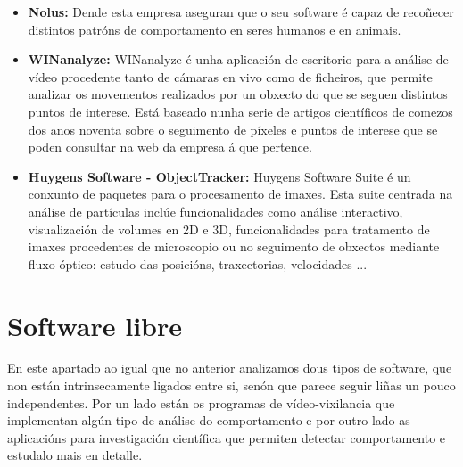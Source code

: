         \begin{itemize}
        \item  \textbf{Nolus:}\cite{nolus-human-behaviour}
            Dende esta empresa aseguran que o seu software é capaz de recoñecer distintos patróns de 
            comportamento en seres humanos e en animais.
        
        \item \textbf{WINanalyze:}\cite{WINanalyze-web-page}
            WINanalyze é unha aplicación de escritorio para a análise de vídeo procedente tanto de 
            cámaras en vivo como de ficheiros, que permite analizar os movementos realizados por un 
            obxecto do que se seguen distintos puntos de interese. Está baseado nunha serie de artigos
            científicos de comezos dos anos noventa sobre o seguimento de píxeles e puntos de interese
            que se poden consultar na web da empresa á que pertence\cite{mikromak-publications}.
        
        \item \textbf{Huygens Software - ObjectTracker:}\cite{Huygens-ObjectTracker}
            Huygens Software Suite é un conxunto de paquetes para o procesamento de imaxes.
            Esta suite centrada na análise de partículas inclúe funcionalidades como análise interactivo,
            visualización de volumes en 2D e 3D, funcionalidades para tratamento de imaxes procedentes
            de microscopio ou no seguimento de obxectos mediante fluxo óptico: estudo das posicións,
            traxectorias, velocidades ...
            
        \end{itemize}

    \section{Software libre}
    \label{sec:video-vixilancia-libre}
        En este apartado ao igual que no anterior analizamos dous tipos de software, que non están
        intrinsecamente ligados entre si, senón que parece seguir liñas un pouco independentes. Por
        un lado están os programas de vídeo-vixilancia que implementan algún tipo de análise do
        comportamento e por outro lado as aplicacións para investigación científica que permiten 
        detectar comportamento e estudalo mais en detalle.
        
